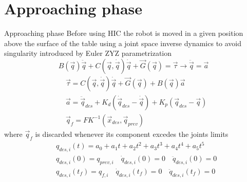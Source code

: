 \section{Approaching phase}
\begin{frame}{Approaching phase}
  Before using HIC the robot is moved in a given position above the surface of the table using a joint space inverse dynamics
  to avoid singularity introduced by Euler ZYZ parametrization
  \[
  B(\vec{q}) \ddot{\vec{q}} + C(\vec{q}, \dot{\vec{q}}) \dot{\vec{q}} + \vec{G}(\vec{q}) = \vec{\tau}
  \longrightarrow \ddot{\vec{q}} = \vec{a}
  \]
  \[
  \begin{split}
    &\vec{\tau} = C(\vec{q}, \dot{\vec{q}}) \dot{\vec{q}} + \vec{G}(\vec{q})  +  B(\vec{q}) \vec{a}\\
    &\vec{a} = \ddot{\vec{q}}_{des} + K_d(\dot{\vec{q}}_{des} - \dot{\vec{q}}) + K_p(\vec{q}_{des} - \vec{q})\\
    &\vec{q}_{f} = FK^{-1}(\vec{x}_{des}, \vec{q}_{prev})
  \end{split}
  \]
  where $\vec{q}_f$ is discarded whenever its component excedes the joints limits
  \[
  \begin{split}
    &q_{des, i}(t) = a_0 + a_1 t + a_2 t^2 + a_3 t^3 + a_4 t^4 + a_5 t^5\\
    &q_{des, i}(0) = q_{prev,i} \quad \dot{q}_{des, i}(0) = 0 \quad \ddot{q}_{des, i}(0) = 0\\
    &q_{des, i}(t_f) = q_{f,i} \quad \dot{q}_{des, i}(t_f) = 0 \quad \ddot{q}_{des, i}(t_f) = 0
  \end{split}
  \]
\end{frame}
